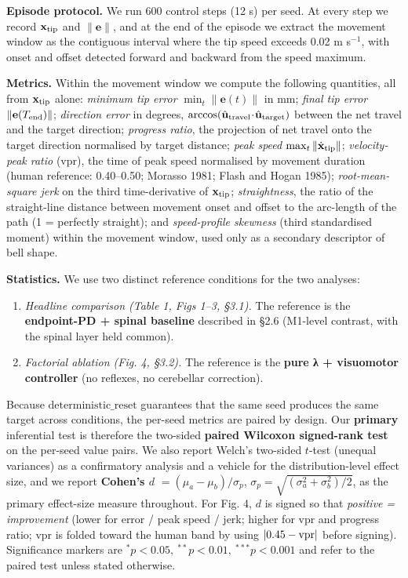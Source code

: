 \documentclass[
  11pt,
]{article}
\begin{document}
\textbf{Episode protocol.} We run 600 control steps (12 s) per seed. At
every step we record \(\mathbf{x}_{\rm tip}\) and \(\|\mathbf{e}\|\),
and at the end of the episode we extract the movement window as the
contiguous interval where the tip speed exceeds 0.02 m s\(^{-1}\), with
onset and offset detected forward and backward from the speed maximum.

\textbf{Metrics.} Within the movement window we compute the following
quantities, all from \(\mathbf{x}_{\rm tip}\) alone: \emph{minimum tip
error} \(\min_{t}\|\mathbf{e}(t)\|\) in mm; \emph{final tip error}
\(\|\mathbf{e}(T_{\rm end})\|\); \emph{direction error} in degrees,
\(\arccos(\hat{\mathbf{u}}_{\rm travel}\!\cdot\!\hat{\mathbf{u}}_{\rm target})\)
between the net travel and the target direction; \emph{progress ratio},
the projection of net travel onto the target direction normalised by
target distance; \emph{peak speed}
\(\max_{t}\|\dot{\mathbf{x}}_{\rm tip}\|\); \emph{velocity-peak ratio}
(vpr), the time of peak speed normalised by movement duration (human
reference: 0.40--0.50; Morasso 1981; Flash and Hogan 1985);
\emph{root-mean-square jerk} on the third time-derivative of
\(\mathbf{x}_{\rm tip}\); \emph{straightness}, the ratio of the
straight-line distance between movement onset and offset to the
arc-length of the path (1 = perfectly straight); and \emph{speed-profile
skewness} (third standardised moment) within the movement window, used
only as a secondary descriptor of bell shape.

\textbf{Statistics.} We use two distinct reference conditions for the
two analyses:

\begin{enumerate}
\def\labelenumi{\arabic{enumi}.}
\item
  \emph{Headline comparison (Table 1, Figs 1--3, §3.1).} The reference
  is the \textbf{endpoint-PD + spinal baseline} described in §2.6
  (M1-level contrast, with the spinal layer held common).
\item
  \emph{Factorial ablation (Fig. 4, §3.2).} The reference is the
  \textbf{pure λ + visuomotor controller} (no reflexes, no cerebellar
  correction).
\end{enumerate}

Because \(\mathrm{deterministic\_reset}\) guarantees that the same seed
produces the same target across conditions, the per-seed metrics are
paired by design. Our \textbf{primary} inferential test is therefore the
two-sided \textbf{paired Wilcoxon signed-rank test} on the per-seed
value pairs. We also report Welch's two-sided \(t\)-test (unequal
variances) as a confirmatory analysis and a vehicle for the
distribution-level effect size, and we report \textbf{Cohen's \(d\)}
\(= (\mu_{a} - \mu_{b})/\sigma_{p}\),
\(\sigma_{p} = \sqrt{(\sigma_{a}^{2}+\sigma_{b}^{2})/2}\), as the
primary effect-size measure throughout. For Fig. 4, \(d\) is signed so
that \emph{positive = improvement} (lower for error / peak speed / jerk;
higher for vpr and progress ratio; vpr is folded toward the human band
by using \(|0.45 - {\rm vpr}|\) before signing). Significance markers
are \(^{*}p<0.05,\ ^{**}p<0.01,\ ^{***}p<0.001\) and refer to the paired
test unless stated otherwise.
\end{document}

